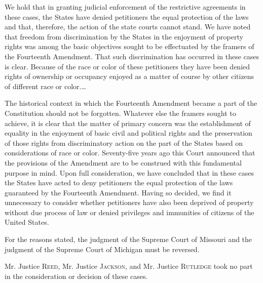 We hold that in granting judicial enforcement of the restrictive agreements in
these cases, the States have denied petitioners the equal protection of the laws
and that, therefore, the action of the state courts cannot stand. We have noted
that freedom from discrimination by the States in the enjoyment of property
rights was among the basic objectives sought to be effectuated by the framers of
the Fourteenth Amendment. That such discrimination has occurred in these cases
is clear. Because of the race or color of these petitioners they have been
denied rights of ownership or occupancy enjoyed as a matter of course by other
citizens of different race or color.\ldots

The historical context in which the Fourteenth Amendment became a part of the
Constitution should not be forgotten. Whatever else the framers sought to
achieve, it is clear that the matter of primary concern was the establishment of
equality in the enjoyment of basic civil and political rights and the
preservation of those rights from discriminatory action on the part of the
States based on considerations of race or color. Seventy-five years ago this
Court announced that the provisions of the Amendment are to be construed with
this fundamental purpose in mind. Upon full consideration, we have concluded
that in these cases the States have acted to deny petitioners the equal
protection of the laws guaranteed by the Fourteenth Amendment. Having so
decided, we find it unnecessary to consider whether petitioners have also been
deprived of property without due process of law or denied privileges and
immunities of citizens of the United States.

For the reasons stated, the judgment of the Supreme Court of Missouri and the
judgment of the Supreme Court of Michigan must be reversed.

Mr. Justice \textsc{Reed}, Mr. Justice \textsc{Jackson}, and Mr. Justice
\textsc{Rutledge} took no part in the consideration or decision of these cases.

